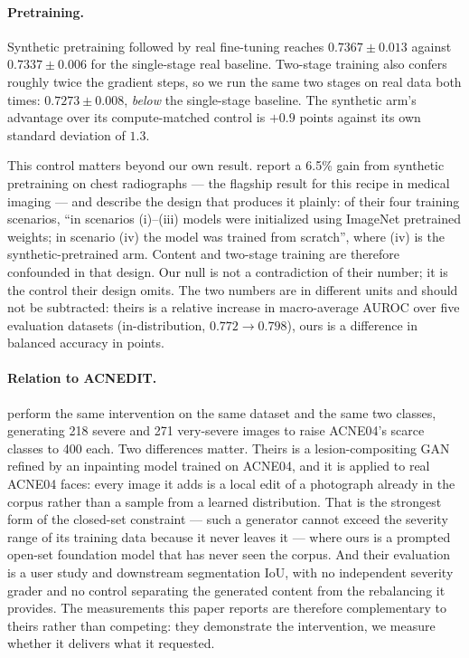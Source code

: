 \documentclass[11pt]{article}
\begin{document}
\paragraph{Pretraining.} Synthetic pretraining followed by real fine-tuning reaches
$0.7367 \pm 0.013$ against $0.7337 \pm 0.006$ for the single-stage real baseline. Two-stage
training also confers roughly twice the gradient steps, so we run the same two stages on
real data both times: $0.7273 \pm 0.008$, \emph{below} the single-stage baseline. The
synthetic arm's advantage over its compute-matched control is $+0.9$ points against its own
standard deviation of $1.3$.

This control matters beyond our own result. \citet{moroianu2025} report a 6.5\% gain from
synthetic pretraining on chest radiographs --- the flagship result for this recipe in medical
imaging --- and describe the design that produces it plainly: of their four training
scenarios, ``in scenarios (i)--(iii) models were initialized using ImageNet pretrained
weights; in scenario (iv) the model was trained from scratch'', where (iv) is the
synthetic-pretrained arm. Content and two-stage training are therefore confounded in that
design. Our null is not a contradiction of their number; it is the control their design
omits. The two numbers are in different units and should not be subtracted: theirs is a
relative increase in macro-average AUROC over five evaluation datasets (in-distribution,
$0.772 \to 0.798$), ours is a difference in balanced accuracy in points.

\paragraph{Relation to \textsc{ACNEDIT}.} \citet{acnedit2025} perform the same
intervention on the same dataset and the same two classes, generating 218 severe and 271
very-severe images to raise ACNE04's scarce classes to 400 each. Two differences matter.
Theirs is a lesion-compositing GAN refined by an inpainting model trained on ACNE04, and
it is applied to real ACNE04 faces: every image it adds is a local edit of a photograph
already in the corpus rather than a sample from a learned distribution. That is the
strongest form of the closed-set constraint --- such a generator cannot exceed the
severity range of its training data because it never leaves it --- where ours is a
prompted open-set foundation model that has never seen the corpus. And their evaluation is
a user study and downstream segmentation IoU, with no independent severity grader and no
control separating the generated content from the rebalancing it provides. The
measurements this paper reports are therefore complementary to theirs rather than
competing: they demonstrate the intervention, we measure whether it delivers what it
requested.
\end{document}
